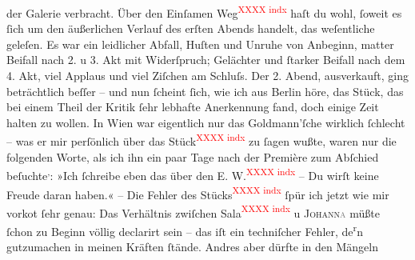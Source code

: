 \begin{ledgroupsized}[t]{13cm}
               der Galerie verbracht.\pend
           \pstart
           Über den Einſamen Weg\textcolor{red}{\textsuperscript{XXXX indx}} haſt du wohl, ſoweit es ſich
               um den äußerlichen Verlauf des erſten Abends handelt, das weſentliche geleſen. Es war
               ein leidlicher Abfall, Huſten und Unruhe von Anbeginn, matter Beifall nach 2. u 3.
               Akt mit Widerſpruch; Gelächter und ſtarker Beifall nach dem 4. Akt, viel Applaus und
               viel Ziſchen am {\pb}Schluſs. Der 2. Abend, ausverkauft, ging beträchtlich beſſer – und nun ſcheint
               ſich, wie ich aus Berlin höre, das Stück, das bei
               einem Theil der Kritik ſehr lebhafte Anerkennung fand, doch einige Zeit halten zu
               wollen. In Wien war eigentlich nur das Goldmann’ſche \label{K_L01376_2v}\label{K_L01376_2h}
               wirklich ſchlecht – was er mir perſönlich über das Stück\textcolor{red}{\textsuperscript{XXXX indx}} zu ſagen wußte, waren nur die folgenden Worte, als
               ich ihn ein paar Tage nach der Première zum Abſchied {\pb}beſuchte\substVorne{}\textsuperscript{,}\substDazwischen{}:\substHinten{} »Ich ſchreibe eben das \label{K_L01376_3v}\label{K_L01376_3h} über den E. W.\textcolor{red}{\textsuperscript{XXXX indx}} – Du wirſt keine Freude daran haben.« – Die Fehler des Stücks\textcolor{red}{\textsuperscript{XXXX indx}}{ }ſpür ich jetzt wie mir vorko{\geminationm}t ſehr genau: Das Verhältnis zwiſchen Sala\textcolor{red}{\textsuperscript{XXXX indx}} u \textsc{Johann\textcolor{gray}{a}} müßte ſchon zu Beginn völlig declarirt sein – das iſt ein techniſcher Fehler, de\substVorne{}\textsuperscript{r}\substDazwischen{}n\substHinten{} gutzumachen in meinen Kräften ſtände. Andres aber dürfte in den Mängeln

\end{ledgroupsized}
